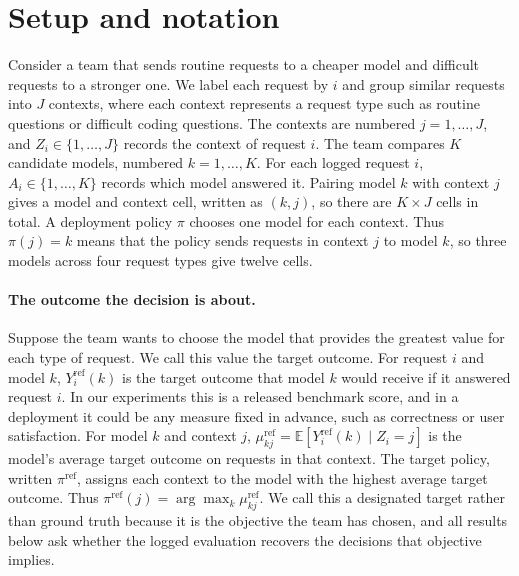 \documentclass{article}
\theoremstyle{plain}
\theoremstyle{remark}
\newcommand{\Yref}{Y^{\mathrm{ref}}}
\newcommand{\muref}{\mu^{\mathrm{ref}}}
\newcommand{\piref}{\pi^{\mathrm{ref}}}
\begin{document}
\section{Setup and notation}\label{sec:setup}
Consider a team that sends routine requests to a cheaper model and difficult requests to a stronger
one. We label each request by $i$ and group similar requests into $J$ contexts, where each context
represents a request type such as routine questions or difficult coding questions. The contexts are
numbered $j=1,\dots,J$, and $Z_i\in\{1,\dots,J\}$ records the context of request $i$. The team
compares $K$ candidate models, numbered $k=1,\dots,K$. For each logged request $i$,
$A_i\in\{1,\dots,K\}$ records which model answered it. Pairing model $k$ with context $j$ gives a
model and context cell, written as $(k,j)$, so there are $K\times J$ cells in total. A deployment
policy $\pi$ chooses one model for each context. Thus $\pi(j)=k$ means that the policy sends requests
in context $j$ to model $k$, so three models across four request types give twelve cells.

\paragraph{The outcome the decision is about.} Suppose the team wants to choose the model that
provides the greatest value for each type of request. We call this value the target outcome. For
request $i$ and model $k$, $\Yref_i(k)$ is the target outcome that model $k$ would receive if it
answered request $i$. In our experiments this is a released benchmark score, and in a deployment it
could be any measure fixed in advance, such as correctness or user satisfaction.
For model $k$ and context $j$, $\muref_{kj}=\mathbb E[\Yref_i(k)\mid Z_i=j]$ is the model's
average target outcome on requests in that context. The target policy, written $\piref$, assigns each
context to the model with the highest average target outcome. Thus
$\piref(j)=\arg\max_k \muref_{kj}$. We call this a designated target rather than ground truth because
it is the objective the team has chosen, and all results below ask whether the logged evaluation
recovers the decisions that objective implies.
\end{document}
